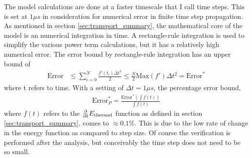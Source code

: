 The model calculations are done at a faster timescale that I call time steps. This is set at $1\mu s$ in consideration for numerical error in finite time step propagation. As mentioned in section \ref{sec:transport_summary}, the mathematical core of the model is an numerical integration in time. A rectangle-rule integration is used to simplify the various power term calculations, but it has a relatively high numerical error. The error bound by rectangle-rule integration has an upper bound of 
\begin{align}
    \text{Error} &\leq \sum_{i = 0}^{N} \frac{f'(t_i)\Delta t^2}{2} \leq \frac{N}{2}\text{Max}(f')\Delta t^2 = \text{Error}^*
\end{align}
where t refers to time. With a setting of $\Delta t = 1\mu s$, the percentage error bound,
\begin{align}
    \text{Error}^*_P = \frac{\text{Error}^*(\int f(t))}{\int f(t)}
\end{align}
where $f(t)$ refers to the $\frac{\partial}{\partial t} E_{\text{thermal}}$ function as defined in section \ref{sec:transport_summary}, comes to $\approx 0.1\%$. This is due to the low rate of change in the energy function as compared to step size. Of course the verification is performed after the analysis, but conceivably the time step does not need to be so small. 





